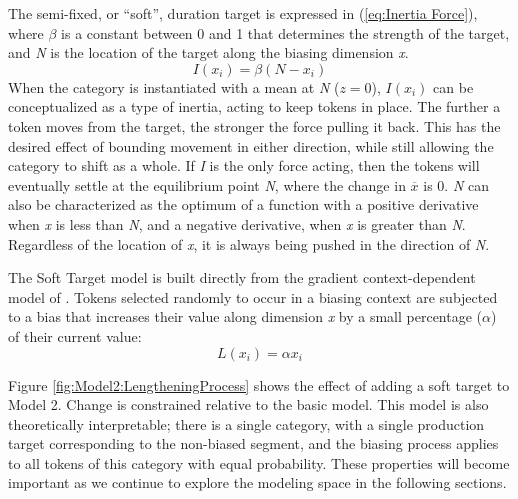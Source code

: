 The semi-fixed, or “soft”, duration target is expressed in (\ref{eq:Inertia Force}),
where $\beta$ is a constant between 0 and 1 that determines the strength
of the target, and \emph{N} is the location of the target along the
biasing dimension \emph{x}.
\begin{equation}
I(x_{i})=\beta(N-x_{i})\label{eq:Inertia Force}
\end{equation}
When the category is instantiated with a mean at \emph{N} ($z=0$),
$I(x_{i})$ can be conceptualized as a type of inertia, acting to keep
tokens in place. The further a token moves from the target, the stronger
the force pulling it back. This has the desired effect of bounding
movement in either direction, while still allowing the category to
shift as a whole. If \emph{I} is the only force acting, then the tokens
will eventually settle at the equilibrium point \emph{N}, where the
change in \emph{$\overline{x}$} is 0. \emph{N} can also be characterized
as the optimum of a function with a positive derivative when \emph{x}
is less than \emph{N}, and a negative derivative, when \emph{x} is
greater than \emph{N}. Regardless of the location of \emph{x}, it
is always being pushed in the direction of \emph{N}. 

The Soft Target model is built directly from the gradient context-dependent
model of . Tokens selected
randomly to occur in a biasing context are subjected to a bias that
increases their value along dimension \emph{x} by a small percentage
($\alpha$) of their current value: 
\begin{equation}
L(x_{i})=\alpha x_{i}\label{eq:Lengthening Force}
\end{equation}

Figure \ref{fig:Model2:LengtheningProcess} shows the effect of adding
a soft target to Model 2. Change is constrained relative to the basic
model. This model is also theoretically interpretable; there is a
single category, with a single production target corresponding to
the non-biased segment, and the biasing process applies to all tokens
of this category with equal probability. These properties will become
important as we continue to explore the modeling space in the following
sections. 

